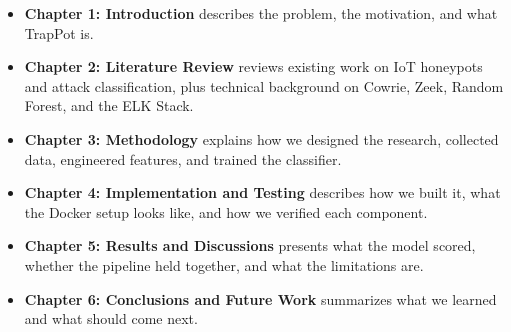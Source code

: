 \begin{itemize}
\item \textbf{Chapter 1: Introduction} describes the problem, the motivation, and what TrapPot is.
\item \textbf{Chapter 2: Literature Review} reviews existing work on IoT honeypots and attack classification, plus technical background on Cowrie, Zeek, Random Forest, and the ELK Stack.
\item \textbf{Chapter 3: Methodology} explains how we designed the research, collected data, engineered features, and trained the classifier.
\item \textbf{Chapter 4: Implementation and Testing} describes how we built it, what the Docker setup looks like, and how we verified each component.
\item \textbf{Chapter 5: Results and Discussions} presents what the model scored, whether the pipeline held together, and what the limitations are.
\item \textbf{Chapter 6: Conclusions and Future Work} summarizes what we learned and what should come next.
\end{itemize}
